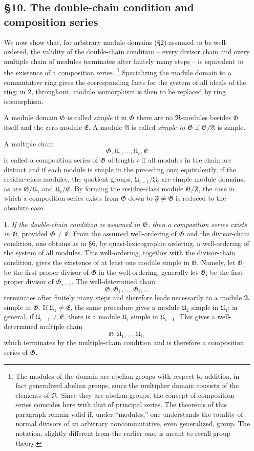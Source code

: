 \documentclass[11pt]{article}
\providecommand{\mR}{\mathfrak{R}}
\providecommand{\mA}{\mathfrak{A}}
\providecommand{\mE}{\mathfrak{E}}
\providecommand{\mF}{\mathfrak{F}}
\providecommand{\mG}{\mathfrak{G}}
\providecommand{\mU}{\mathfrak{U}}
\begin{document}
\subsection*{§10. The double-chain condition and composition series}

We now show that, for arbitrary module domains (§2) assumed to be well-ordered, the validity of the double-chain condition -- every divisor chain and every multiple chain of modules terminates after finitely many steps -- is equivalent to the existence of a composition series.
\footnote{The modules of the domain are abelian groups with respect to addition, in fact generalized abelian groups, since the multiplier domain consists of the elements of $\mR$. Since they are abelian groups, the concept of composition series coincides here with that of principal series. The theorems of this paragraph remain valid if, under ``modules,'' one understands the totality of normal divisors of an arbitrary noncommutative, even generalized, group. The notation, slightly different from the earlier one, is meant to recall group theory.}
Specializing the module domain to a commutative ring gives the corresponding facts for the system of all ideals of the ring; in 2, throughout, module isomorphism is then to be replaced by ring isomorphism.

A module domain $\mG$ is called \emph{simple} if in $\mG$ there are no $\mR$-modules besides $\mG$ itself and the zero module $\mE$. A module $\mA$ is called \emph{simple in $\mG$} if $\mG/\mA$ is simple.

A multiple chain
\[
        \mG,\mU_1,\ldots,\mU_r,\mE
\]
is called a composition series of $\mG$ of length $r$ if all modules in the chain are distinct and if each module is simple in the preceding one; equivalently, if the residue-class modules, the quotient groups, $\mU_{i-1}/\mU_i$ are simple module domains, as are $\mG/\mU_1$ and $\mU_r/\mE$. By forming the residue-class module $\mG/\mF$, the case in which a composition series exists from $\mG$ down to $\mF\ne\mG$ is reduced to the absolute case.

1. \emph{If the double-chain condition is assumed in $\mG$, then a composition series exists in $\mG$}, provided $\mG\ne\mE$. From the assumed well-ordering of $\mG$ and the divisor-chain condition, one obtains as in §6, by quasi-lexicographic ordering, a well-ordering of the system of all modules. This well-ordering, together with the divisor-chain condition, gives the existence of at least one module simple in $\mG$. Namely, let $\mG_1$ be the first proper divisor of $\mG$ in the well-ordering; generally let $\mG_i$ be the first proper divisor of $\mG_{i-1}$. The well-determined chain
\[
        \mG,\mG_1,\ldots,\mG_i,\ldots
\]
terminates after finitely many steps and therefore leads necessarily to a module $\mA$ simple in $\mG$. If $\mU_1\ne\mE$, the same procedure gives a module $\mU_2$ simple in $\mU_1$; in general, if $\mU_{i-1}\ne\mE$, there is a module $\mU_i$ simple in $\mU_{i-1}$. This gives a well-determined multiple chain
\[
        \mG,\mU_1,\ldots,\mU_i,
\]
which terminates by the multiple-chain condition and is therefore a composition series of $\mG$.
\end{document}
